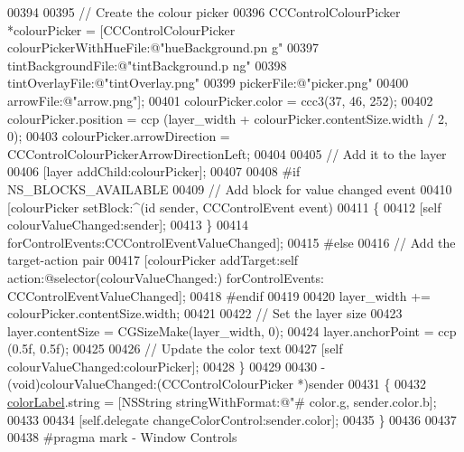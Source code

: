 \begin{DoxyCode}
{{{00394     
00395     \textcolor{comment}{// Create the colour picker}
00396     CCControlColourPicker *colourPicker = [CCControlColourPicker colourPickerWithHueFile:@"hueBackground.pn
      g"
00397                                                                       tintBackgroundFile:@"tintBackground.p
      ng"
00398                                                                          tintOverlayFile:@"tintOverlay.png"
00399                                                                               pickerFile:@"picker.png"
00400                                                                                arrowFile:@"arrow.png"];
00401     colourPicker.color                  = ccc3(37, 46, 252);
00402     colourPicker.position               = ccp (layer\_width + colourPicker.contentSize.width / 2, 0);
00403     colourPicker.arrowDirection         = CCControlColourPickerArrowDirectionLeft;
00404     
00405     \textcolor{comment}{// Add it to the layer}
00406     [layer addChild:colourPicker];
00407     
00408 \textcolor{preprocessor}{#if NS\_BLOCKS\_AVAILABLE}
00409 \textcolor{preprocessor}{}    \textcolor{comment}{// Add block for value changed event}
00410     [colourPicker setBlock:^(id sender, CCControlEvent event)
00411      \{
00412          [\textcolor{keyword}{self} colourValueChanged:sender];
00413      \}
00414           forControlEvents:CCControlEventValueChanged];
00415 \textcolor{preprocessor}{#else}
00416 \textcolor{preprocessor}{}    \textcolor{comment}{// Add the target-action pair}
00417     [colourPicker addTarget:self action:@selector(colourValueChanged:) forControlEvents:
      CCControlEventValueChanged];
00418 \textcolor{preprocessor}{#endif}
00419 \textcolor{preprocessor}{}    
00420     layer\_width += colourPicker.contentSize.width;
00421     
00422     \textcolor{comment}{// Set the layer size}
00423     layer.contentSize                   = CGSizeMake(layer\_width, 0);
00424     layer.anchorPoint                   = ccp (0.5f, 0.5f);
00425     
00426     \textcolor{comment}{// Update the color text}
00427     [\textcolor{keyword}{self} colourValueChanged:colourPicker];
00428 \}
00429 
00430 - (void)colourValueChanged:(CCControlColourPicker *)sender
00431 \{
00432     \hyperlink{interface_controls_layer_aa3d424dcbfa618632f97478ee61148cb}{colorLabel}.string   = [NSString stringWithFormat:@"#%
      color.g, sender.color.b];
00433     
00434     [\textcolor{keyword}{self}.delegate changeColorControl:sender.color];
00435 \}
00436 
00437 
00438 \textcolor{preprocessor}{#pragma mark - Window Controls}
}}}
\end{DoxyCode}
